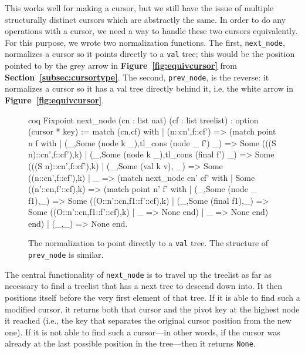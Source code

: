 \documentclass[12pt]{article}
\begin{document}
This works well for making a cursor, but we still have the issue of multiple structurally distinct cursors which are abstractly the same. In order to do any operations with a cursor, we need a way to handle these two cursors equivalently. For this purpose, we wrote two normalization functions. The first, \texttt{next\_node}, normalizes a cursor so it points directly to a \texttt{val} tree; this would be the position pointed to by the grey arrow in \textbf{Figure~\ref{fig:equivcursor}} from \textbf{Section~\ref{subsec:cursortype}}. The second, \texttt{prev\_node}, is the reverse: it normalizes a cursor so it has a val tree directly behind it, i.e. the white arrow in \textbf{Figure~\ref{fig:equivcursor}}.

\begin{singlespace}
\begin{figure}[ht]
\centering
\begin{cminted}{coq}
Fixpoint next_node (cn : list nat) (cf : list treelist)
  : option (cursor * key) :=
  match (cn,cf) with
  | (n::cn',f::cf') =>
    (match point n f with
     | (_,Some (node k _),tl_cons (node _ f') _) =>
       Some (((S n)::cn',f::cf'),k)
     | (_,Some (node k _),tl_cons (final f') _) =>
       Some (((S n)::cn',f::cf'),k)
     | (_,Some (val k v), _) => Some ((n::cn',f::cf'),k)
     | _ =>
       (match next_node cn' cf' with
        | Some ((n'::cn,f'::cf),k) =>
          (match point n' f' with
           | (_,Some (node _ f1),_) =>
             Some ((O::n'::cn,f1::f'::cf),k)
           | (_,Some (final f1),_) =>
             Some ((O::n'::cn,f1::f'::cf),k)
           | _ => None
           end)
        | _ => None
        end)
     end)
  | (_,_) => None
  end.
\end{cminted}
\caption{The normalization to point directly to a \texttt{val} tree. The structure of \texttt{prev\_node} is similar.}
\end{figure}
\end{singlespace}

The central functionality of \texttt{next\_node} is to travel up the treelist as far as necessary to find a treelist that has a next tree to descend down into. It then positions itself before the very first element of that tree. If it is able to find such a modified cursor, it returns both that cursor and the pivot key at the highest node it reached (i.e., the key that separates the original cursor position from the new one). If it is not able to find such a cursor---in other words, if the cursor was already at the last possible position in the tree---then it returns \texttt{None}.
\end{document}
